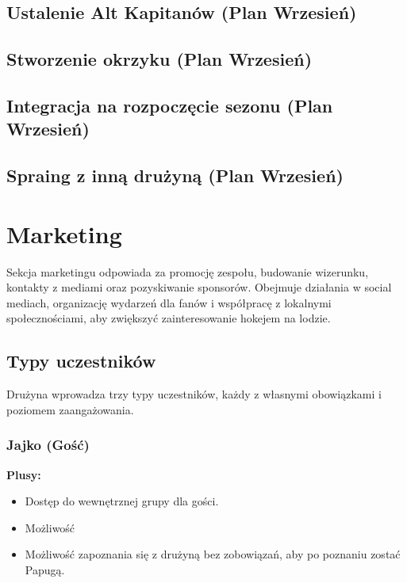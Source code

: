\documentclass{article}
\begin{document}
\subsection{Ustalenie Alt Kapitanów (Plan Wrzesień)}

\subsection{Stworzenie okrzyku (Plan Wrzesień)}

\subsection{Integracja na rozpoczęcie sezonu (Plan Wrzesień)}

\subsection{Spraing z inną drużyną (Plan Wrzesień)}

\section{Marketing}

Sekcja marketingu odpowiada za promocję zespołu, budowanie wizerunku, kontakty z mediami oraz pozyskiwanie sponsorów. Obejmuje działania w social mediach, organizację wydarzeń dla fanów i współpracę z lokalnymi społecznościami, aby zwiększyć zainteresowanie hokejem na lodzie.

\subsection{Typy uczestników}

Drużyna wprowadza trzy typy uczestników, każdy z własnymi obowiązkami i poziomem zaangażowania.

\subsubsection{Jajko (Gość)}

\textbf{Plusy:}
\begin{itemize}
    \item Dostęp do wewnętrznej grupy dla gości.
    \item Możliwość 
    \item Możliwość zapoznania się z drużyną bez zobowiązań, aby po poznaniu zostać Papugą.

\end{itemize}
\end{document}
